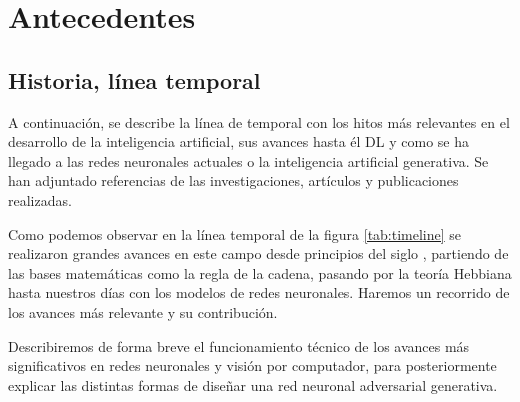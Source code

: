 \section{Antecedentes}
\label{ch:2:section:background}

\subsection{Historia, línea temporal}


A continuación, se describe la línea de temporal con los hitos más relevantes en el desarrollo de la inteligencia artificial, sus avances hasta él \gls{DL} y como se ha llegado a las redes neuronales actuales o la inteligencia artificial generativa. Se han adjuntado referencias de las investigaciones, artículos y publicaciones realizadas. \cite{TIMELINE-schmidhuber2022annotated}

Como podemos observar en la línea temporal de la figura \ref{tab:timeline} se realizaron grandes avances en este campo desde principios del siglo , partiendo de las bases matemáticas como la regla de la cadena, pasando por la teoría Hebbiana hasta nuestros días con los modelos de redes neuronales. Haremos un recorrido de los avances más relevante y su contribución.

Describiremos de forma breve el funcionamiento técnico de los avances más significativos en redes neuronales y visión por computador, para posteriormente explicar las distintas formas de diseñar una red neuronal adversarial generativa.

